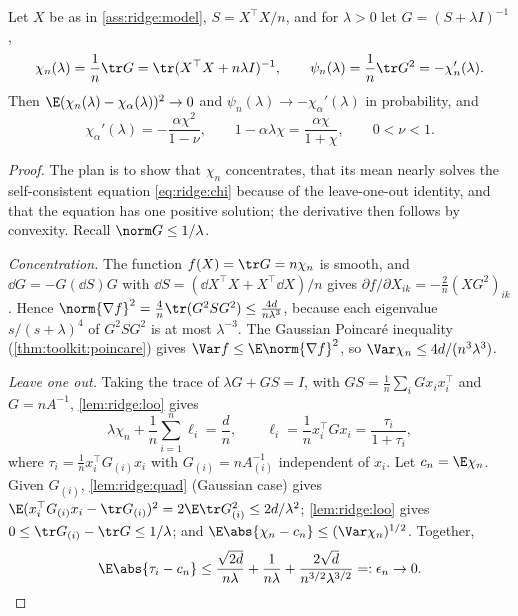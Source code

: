 \begin{refsection}
\begin{proposition}\label{prop:ridge:chi}
Let $X$ be as in \cref{ass:ridge:model}, $S=X^\top X/n$, and for $\lambda>0$ let $G=(S+\lambda I)^{-1}$,
\[
\chi_n(\lambda)=\frac1n\tr G=\tr(X^\top X+n\lambda I)^{-1},\qquad\psi_n(\lambda)=\frac1n\tr G^2=-\chi_n'(\lambda).
\]
Then $\E(\chi_n(\lambda)-\chi_\alpha(\lambda))^2\to0$ and $\psi_n(\lambda)\to-\chi_\alpha'(\lambda)$ in probability, and
\begin{equation}\label{eq:ridge:chiprime}
\chi_\alpha'(\lambda)=-\frac{\alpha\chi^2}{1-\nu},\qquad 1-\alpha\lambda\chi=\frac{\alpha\chi}{1+\chi},\qquad 0<\nu<1.
\end{equation}
\end{proposition}

\begin{proof}
The plan is to show that $\chi_n$ concentrates, that its mean nearly solves the self-consistent equation \eqref{eq:ridge:chi} because of the leave-one-out identity, and that the equation has one positive solution; the derivative then follows by convexity. Recall $\norm G\le1/\lambda$.

\emph{Concentration.} The function $f(X)=\tr G=n\chi_n$ is smooth, and $\dd G=-G(\dd S)G$ with $\dd S=(\dd X^\top X+X^\top\dd X)/n$ gives $\partial f/\partial X_{ik}=-\frac2n(XG^2)_{ik}$. Hence $\norm{\nabla f}^2=\frac4n\tr(G^2SG^2)\le\frac{4d}{n\lambda^3}$, because each eigenvalue $s/(s+\lambda)^4$ of $G^2SG^2$ is at most $\lambda^{-3}$. The Gaussian Poincaré inequality (\cref{thm:toolkit:poincare}) gives $\Var f\le\E\norm{\nabla f}^2$, so $\Var\chi_n\le4d/(n^3\lambda^3)$.

\emph{Leave one out.} Taking the trace of $\lambda G+GS=I$, with $GS=\frac1n\sum_iGx_ix_i^\top$ and $G=nA^{-1}$, \cref{lem:ridge:loo} gives
\begin{equation}\label{eq:ridge:sumrule}
\lambda\chi_n+\frac1n\sum_{i=1}^n\ell_i=\frac dn,\qquad\ell_i=\frac1nx_i^\top Gx_i=\frac{\tau_i}{1+\tau_i},
\end{equation}
where $\tau_i=\frac1nx_i^\top G_{(i)}x_i$ with $G_{(i)}=nA_{(i)}^{-1}$ independent of $x_i$. Let $c_n=\E\chi_n$. Given $G_{(i)}$, \cref{lem:ridge:quad} (Gaussian case) gives $\E(x_i^\top G_{(i)}x_i-\tr G_{(i)})^2=2\E\tr G_{(i)}^2\le2d/\lambda^2$; \cref{lem:ridge:loo} gives $0\le\tr G_{(i)}-\tr G\le1/\lambda$; and $\E\abs{\chi_n-c_n}\le(\Var\chi_n)^{1/2}$. Together,
\[
\E\abs{\tau_i-c_n}\le\frac{\sqrt{2d}}{n\lambda}+\frac1{n\lambda}+\frac{2\sqrt d}{n^{3/2}\lambda^{3/2}}=:\epsilon_n\to0.
\]


\end{proof}
\end{refsection}
